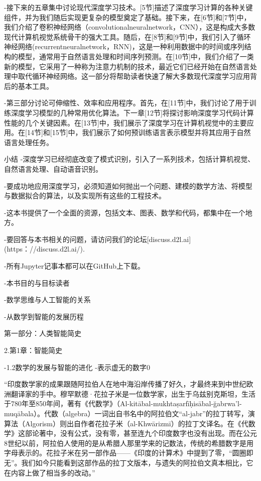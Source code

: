 -接下来的五章集中讨论现代深度学习技术。[5节]描述了深度学习计算的各种关键组件，并为我们随后实现更复杂的模型奠定了基础。接下来，在[6节]和[7节]中，我们介绍了卷积神经网络（convolutionalneuralnetwork，CNN），这是构成大多数现代计算机视觉系统骨干的强大工具。随后，在[8节]和[9节]中，我们引入了循环神经网络(recurrentneuralnetwork，RNN)，这是一种利用数据中的时间或序列结构的模型，通常用于自然语言处理和时间序列预测。在[10节]中，我们介绍了一类新的模型，它采用了一种称为注意力机制的技术，最近它们已经开始在自然语言处理中取代循环神经网络。这一部分将帮助读者快速了解大多数现代深度学习应用背后的基本工具。

-第三部分讨论可伸缩性、效率和应用程序。首先，在[11节]中，我们讨论了用于训练深度学习模型的几种常用优化算法。下一章[12节]将探讨影响深度学习代码计算性能的几个关键因素。在[13节]中，我们展示了深度学习在计算机视觉中的主要应用。在[14节]和[15节]中，我们展示了如何预训练语言表示模型并将其应用于自然语言处理任务。

     小结
-深度学习已经彻底改变了模式识别，引入了一系列技术，包括计算机视觉、自然语言处理、自动语音识别。

-要成功地应用深度学习，必须知道如何抛出一个问题、建模的数学方法、将模型与数据拟合的算法，以及实现所有这些的工程技术。

-这本书提供了一个全面的资源，包括文本、图表、数学和代码，都集中在一个地方。

-要回答与本书相关的问题，请访问我们的论坛[discuss.d2l.ai](https：//discuss.d2l.ai/).

-所有Jupyter记事本都可以在GitHub上下载。



-本书目的与目标读者

-数学思维与人工智能的关系

-从数学到智能的发展历程

    第一部分：人类智能简史

2.第1章：智能简史

-1.2数学的发展与智能的进化
-表示虚无的数字0

“印度数学家的成果跟随阿拉伯人在地中海沿岸传播了好久，才最终来到中世纪欧洲翻译家的手中。穆罕默德·花拉子米是一位数学家，出生于乌兹别克斯坦，生活于780年至850年间，著有《代数学》（Al-kitābal-mukhtaṣarfīḥisābal-ğabrwa’l-muqābala）。代数（algebra）一词出自书名中的阿拉伯文“al-jabr”的拉丁转写，演算法（Algorism）则出自作者花拉子米（al-Khwārizmī）的拉丁文译名。在《代数学》这部论著中，没有公式，没有零，甚至连九个印度数字也没有出现。而在公元8世纪以前，阿拉伯人使用的是从希腊人那里学来的记数法，传统的希腊数字是用字母表示的。花拉子米在另一部作品——《印度的计算术》中提到了零，“圆圈即无”。我们如今只能看到这部作品的拉丁文版本，与遗失的阿拉伯文真本相比，它在内容上做了相当多的改动。”

